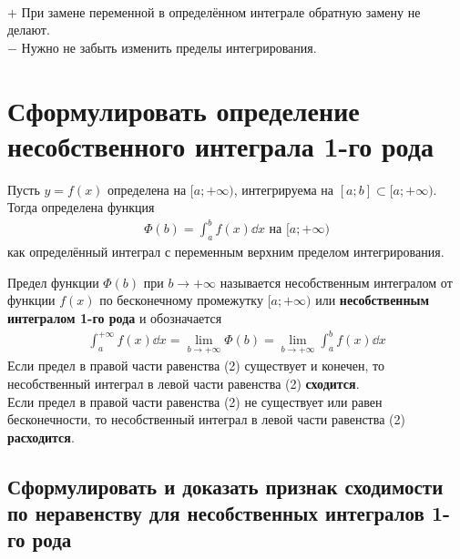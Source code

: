 \begin{remark}\ \\
    \textcircled{$+$} При замене переменной в определённом интеграле обратную замену не делают. \\
    \textcircled{$-$} Нужно не забыть изменить пределы интегрирования.
\end{remark}

\section{Сформулировать определение несобственного интеграла 1-го рода} 
\setcounter{equation}{0}
Пусть $y = f(x)$ определена на $[a; +\infty)$, интегрируема на $[a;b]\subset [a; +\infty)$. Тогда определена функция
\begin{gather}
    \boxed{\Phi (b) = \int_{a}^{b} f(x)\dd{x}} \text{ на } [a; +\infty)
\end{gather}
как определённый интеграл с переменным верхним пределом интегрирования.\\
\begin{definition}
    Предел функции $\Phi(b)$ при $b\to +\infty$ называется несобственным интегралом от функции $f(x)$ по бесконечному промежутку $[a; +\infty)$ или \textbf{несобственным интегралом 1-го рода} и обозначается
    \begin{gather}
        \boxed{\int_{a}^{+\infty} f(x)\dd{x} = \lim_{b \to +\infty} \Phi(b) = \lim\limits_{b \to +\infty} \int_{a}^{b}f(x)\dd{x}} 
    \end{gather}
    Если предел в правой части равенства (2) существует и конечен, то несобственный интеграл в левой части равенства (2) \textbf{сходится}.\\
    Если предел в правой части равенства (2) не существует или равен бесконечности, то несобственный интеграл в левой части равенства (2) \textbf{расходится}.
\end{definition}

\newpage
\subsection{Сформулировать и доказать признак сходимости по неравенству для несобственных интегралов 1-го рода}

